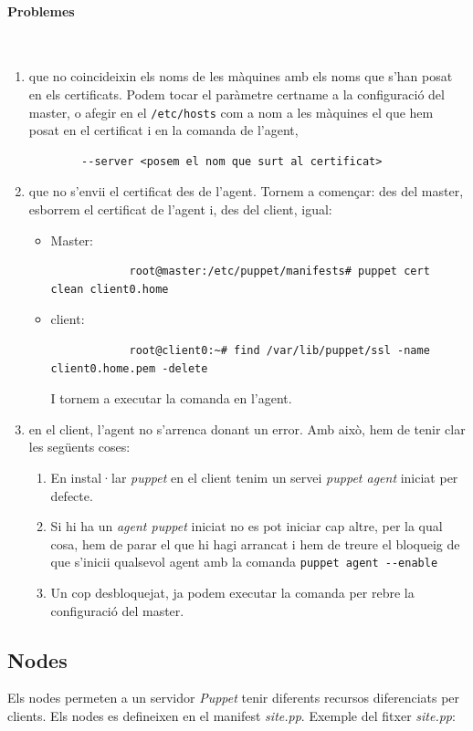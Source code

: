 \documentclass[a4paper]{article}
\begin{document}
\paragraph{Problemes}\\
\begin{enumerate}
	\item que no coincideixin els noms de les màquines amb els noms que s'han posat en els certificats. Podem tocar el paràmetre certname a la configuració del master, o afegir en el \verb+/etc/hosts+ com a nom a les màquines el que hem posat en el certificat i en la comanda de l'agent, 
		\begin{verbatim}
		--server <posem el nom que surt al certificat>
		\end{verbatim}
	\item que no s'envii el certificat des de l'agent. Tornem a començar: des del master, esborrem el certificat de l'agent i, des del client, igual:
	\begin{itemize}
		\item Master:
			\begin{verbatim}
			root@master:/etc/puppet/manifests# puppet cert clean client0.home
			\end{verbatim}
		\item client:
			\begin{verbatim}
			root@client0:~# find /var/lib/puppet/ssl -name client0.home.pem -delete
			\end{verbatim}
			I tornem a executar la comanda en l'agent.
	\end{itemize}
	\item en el client, l'agent no s'arrenca donant un error. Amb això, hem de tenir clar les següents coses:
		\begin{enumerate}
			\item En instal·lar \textit{puppet} en el client tenim un servei \textit{puppet agent} iniciat per defecte.
			\item Si hi ha un \textit{agent puppet} iniciat no es pot iniciar cap altre, per la qual cosa, hem de parar el que hi hagi arrancat i hem de treure el bloqueig de que s'inicii qualsevol agent amb la comanda \verb+puppet agent --enable+
			\item Un cop desbloquejat, ja podem executar la comanda per rebre la configuració del master.
		\end{enumerate}
\end{enumerate}

\subsection{Nodes}
Els nodes permeten a un servidor \textit{Puppet} tenir diferents recursos diferenciats per clients. Els nodes es defineixen en el manifest \textit{site.pp}. Exemple del fitxer \textit{site.pp}:
\end{document}
